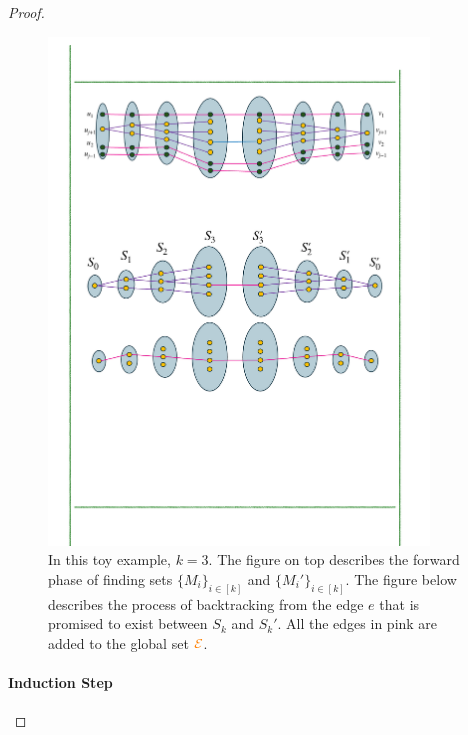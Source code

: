 \documentclass[11pt]{article}
\begin{document}
\begin{proof}
\begin{figure}
	\includegraphics[width=0.9\textwidth
	]{assets/BaseA.pdf}
	\caption{In this toy example, $k=3$. The figure on top describes the forward phase of finding sets $\{M_i\}_{i\in [k]}$ and $\{M_i'\}_{i\in [k]}$. The figure below describes the process of backtracking from the edge $e$ that is promised to exist between $S_k$ and $S_k'$.
    All the edges in pink are added to the global set $\textcolor{orange}{\mathcal{E}}$.}
	\label{fig:baseB}
\end{figure}



\paragraph{Induction Step}
	

\end{proof}
\end{document}
